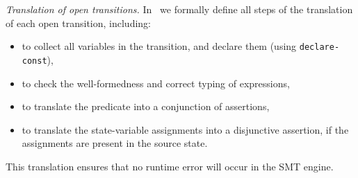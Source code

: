 \documentclass[smallcondensed]{svjour3}
\newcommand{\TODO}[1]{\textcolor{red}{\textbf{[TODO:#1]}}}
\newcommand{\Post}{\symb{Post}}
\begin{document}



\emph{Translation of open transitions.}
In~\cite{Avocs-RR} we formally define all steps of the translation of each
open transition, including:
%
\begin{itemize}
	\item to collect all variables in the transition, and declare them (using \texttt{declare-const}),
	\item to check the well-formedness and correct typing of expressions,
	\item to translate the predicate into a conjunction of assertions,
	\item to translate the state-variable
	assignments into a disjunctive assertion, if the assignments are present in the source state.
\end{itemize}
%
This translation ensures that no runtime error will occur
in the SMT engine.
\end{document}
